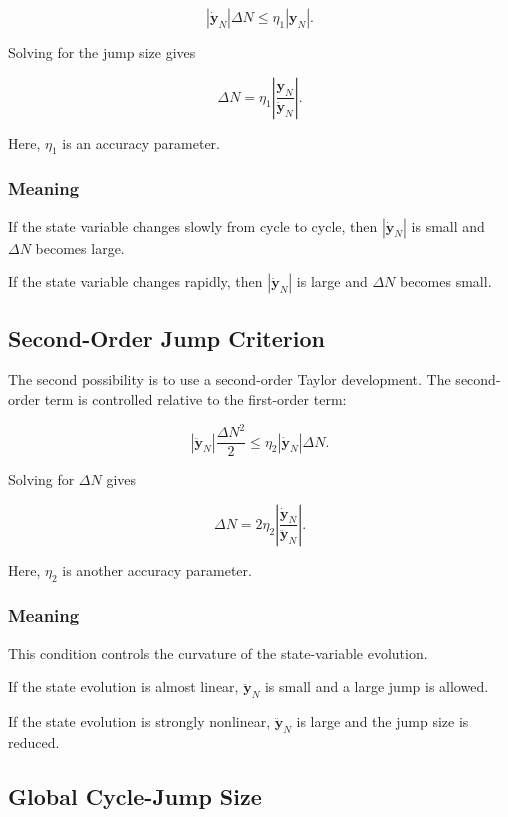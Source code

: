 ﻿\documentclass[11pt,a4paper]{article}
\begin{document}
\[
\left|\dot{\bm{y}}_N\right|\Delta N
\leq
\eta_1
\left|\bm{y}_N\right|.
\]

Solving for the jump size gives

\[
\Delta N
=
\eta_1
\left|
\frac{\bm{y}_N}{\dot{\bm{y}}_N}
\right|.
\]

Here, $\eta_1$ is an accuracy parameter.

\subsubsection*{Meaning}

If the state variable changes slowly from cycle to cycle, then $\left|\dot{\bm{y}}_N\right|$ is small and $\Delta N$ becomes large.

If the state variable changes rapidly, then $\left|\dot{\bm{y}}_N\right|$ is large and $\Delta N$ becomes small.

\subsection{Second-Order Jump Criterion}

The second possibility is to use a second-order Taylor development. The second-order term is controlled relative to the first-order term:

\[
\left|
\ddot{\bm{y}}_N
\right|
\frac{\Delta N^2}{2}
\leq
\eta_2
\left|
\dot{\bm{y}}_N
\right|
\Delta N.
\]

Solving for $\Delta N$ gives

\[
\Delta N
=
2\eta_2
\left|
\frac{\dot{\bm{y}}_N}{\ddot{\bm{y}}_N}
\right|.
\]

Here, $\eta_2$ is another accuracy parameter.

\subsubsection*{Meaning}

This condition controls the curvature of the state-variable evolution.

If the state evolution is almost linear, $\ddot{\bm{y}}_N$ is small and a large jump is allowed.

If the state evolution is strongly nonlinear, $\ddot{\bm{y}}_N$ is large and the jump size is reduced.

\subsection{Global Cycle-Jump Size}
\end{document}
